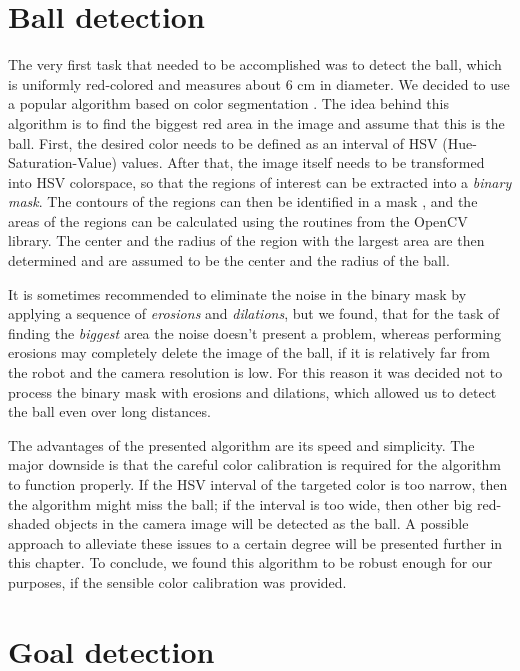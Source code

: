 \section{Ball detection}

The very first task that needed to be accomplished was to detect the ball,
which is uniformly red-colored and measures about 6 cm in diameter. We decided
to use a popular algorithm based on color segmentation \cite{ball-detect}. The
idea behind this algorithm is to find the biggest red area in the image and
assume that this is the ball. First, the desired color needs to be defined as
an interval of HSV (Hue-Saturation-Value) values. After that, the image itself
needs to be transformed into HSV colorspace, so that the regions of interest
can be extracted into a \textit{binary mask}. The contours of the regions can
then be identified in a mask \cite{contours}, and the areas of the regions can
be calculated using the routines from the OpenCV library. The center and the
radius of the region with the largest area are then determined and are assumed
to be the center and the radius of the ball.

It is sometimes recommended \cite{ball-detect} to eliminate the noise in the
binary mask by applying a sequence of \textit{erosions} and \textit{dilations},
but we found, that for the task of finding the \textit{biggest} area the noise
doesn't present a problem, whereas performing erosions may completely delete
the image of the ball, if it is relatively far from the robot and the camera
resolution is low. For this reason it was decided not to process the binary
mask with erosions and dilations, which allowed us to detect the ball even over
long distances.

The advantages of the presented algorithm are its speed and simplicity. The
major downside is that the careful color calibration is required for the
algorithm to function properly. If the HSV interval of the targeted color is
too narrow, then the algorithm might miss the ball; if the interval is too
wide, then other big red-shaded objects in the camera image will be detected as
the ball. A possible approach to alleviate these issues to a certain degree
will be presented further in this chapter. To conclude, we found this algorithm
to be robust enough for our purposes, if the sensible color calibration was
provided.

\section{Goal detection}

